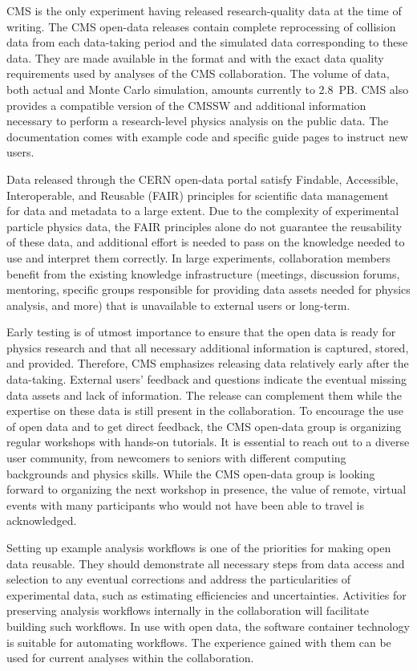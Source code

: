 \documentclass[11pt]{article}
\begin{document}
CMS is the only experiment having released research-quality data at the time of writing. The CMS open-data releases contain complete reprocessing of collision data from each data-taking period and the simulated data corresponding to these data. They are made available in the format and with the exact data quality requirements used by analyses of the CMS collaboration. The volume of data, both actual and Monte Carlo simulation, amounts currently to 2.8~PB. CMS also provides a compatible version of the CMSSW and additional information necessary to perform a research-level physics analysis on the public data. The documentation comes with example code and specific guide pages to instruct new users.

Data released through the CERN open-data portal satisfy Findable, Accessible, Interoperable, and Reusable (FAIR) principles for scientific data management~\cite{FAIR-paper} for data and metadata to a large extent. Due to the complexity of experimental particle physics data, the FAIR principles alone do not guarantee the reusability of these data, and additional effort is needed to pass on the knowledge needed to use and interpret them correctly. In large experiments, collaboration members benefit from the existing knowledge infrastructure (meetings, discussion forums, mentoring, specific groups responsible for providing data assets needed for physics analysis, and more) that is unavailable to external users or long-term. 

Early testing is of utmost importance to ensure that the open data is ready for physics research and that all necessary additional information is captured, stored, and provided. Therefore, CMS emphasizes releasing data relatively early after the data-taking. External users' feedback and questions indicate the eventual missing data assets and lack of information. The release can complement them while the expertise on these data is still present in the collaboration. To encourage the use of open data and to get direct feedback, the CMS open-data group is organizing regular workshops with hands-on tutorials. It is essential to reach out to a diverse user community, from newcomers to seniors with different computing backgrounds and physics skills. While the CMS open-data group is looking forward to organizing the next workshop in presence, the value of remote, virtual events with many participants who would not have been able to travel is acknowledged.

Setting up example analysis workflows is one of the priorities for making open data reusable. They should demonstrate all necessary steps from data access and selection to any eventual corrections and address the particularities of experimental data, such as estimating efficiencies and uncertainties. Activities for preserving analysis workflows internally in the collaboration will facilitate building such workflows. In use with open data, the software container technology is suitable for automating workflows. The experience gained with them can be used for current analyses within the collaboration.
\end{document}

